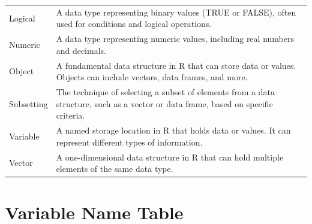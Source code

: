 \documentclass[
]{book}
\begin{document}
\begin{longtable}[]{@{}
  >{\raggedright\arraybackslash}p{}
  >{\raggedright\arraybackslash}p{}@{}}
Logical & A data type representing binary values (TRUE or FALSE), often used for conditions and logical operations. \\
Numeric & A data type representing numeric values, including real numbers and decimals. \\
Object & A fundamental data structure in R that can store data or values. Objects can include vectors, data frames, and more. \\
Subsetting & The technique of selecting a subset of elements from a data structure, such as a vector or data frame, based on specific criteria. \\
Variable & A named storage location in R that holds data or values. It can represent different types of information. \\
Vector & A one-dimensional data structure in R that can hold multiple elements of the same data type. \\
\end{longtable}

\section{Variable Name Table}\label{variable-name-table}
\end{document}
